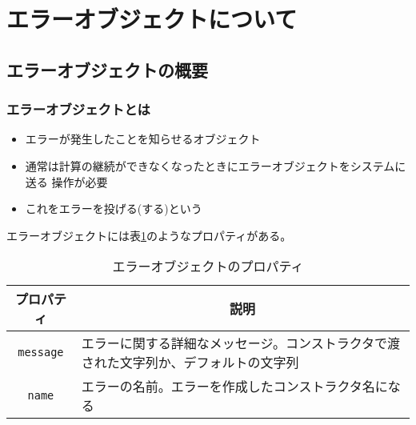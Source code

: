 \documentclass[dvipsk]{beamer}
\begin{document}
\section{エラーオブジェクトについて}
\subsection{エラーオブジェクトの概要}
\begin{frame}[containsverbatim]
 \frametitle{エラーオブジェクトとは}
 \begin{itemize}
  \item エラーが発生したことを知らせるオブジェクト
  \item 通常は計算の継続ができなくなったときにエラーオブジェクトをシステムに送る
操作が必要
  \item これをエラーを投げる(する)という
 \end{itemize}

エラーオブジェクトには表\ref{ErrorProp}のようなプロパティがある。
\begin{table}
 \caption{エラーオブジェクトのプロパティ}\label{ErrorProp}
 \begin{center}
	 \begin{tabular}{|c|m{}|}\hline
		プロパティ&\multicolumn{1}{c|}{説明}\\ \hline
		\texttt{message}&エラーに関する詳細なメッセージ。コンストラクタで渡
				された文字列か、デフォルトの文字列\\ \hline
		\texttt{name}&エラーの名前。エラーを作成したコンストラクタ名になる\\ \hline

	\end{tabular}
 \end{center}
\end{table}
\end{frame}
\end{document}

